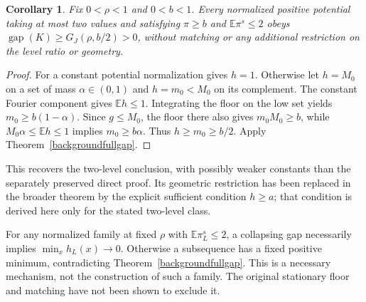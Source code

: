 \documentclass[11pt]{article}
\newcommand{\E}{\mathbb E}
\newtheorem{corollary}[theorem]{Corollary}
\begin{document}
\begin{corollary}\label{twolevelfullgap}
Fix $0<\rho<1$ and $0<b<1$. Every normalized positive potential taking
at most two values and satisfying $\pi\geq b$ and $\E\pi^s\leq2$ obeys
$\operatorname{gap}(K)\geq G_J(\rho,b/2)>0$, without matching or any
additional restriction on the level ratio or geometry.
\end{corollary}
\begin{proof}
For a constant potential normalization gives $h=1$.
Otherwise let $h=M_0$ on a set of mass $\alpha\in(0,1)$ and $h=m_0<M_0$
on its complement. The constant Fourier component gives $\E h\leq1$.
Integrating the floor on the low set yields $m_0\geq b(1-\alpha)$.
Since $g\leq M_0$, the floor there also gives $m_0M_0\geq b$, while
$M_0\alpha\leq\E h\leq1$ implies $m_0\geq b\alpha$.
Thus $h\geq m_0\geq b/2$. Apply Theorem~\ref{backgroundfullgap}.
\end{proof}
This recovers the two-level conclusion, with possibly weaker constants
than the separately preserved direct proof. Its geometric restriction
has been replaced in the broader theorem by the explicit sufficient
condition $h\geq a$; that condition is derived here only for the
stated two-level class.

For any normalized family at fixed $\rho$ with $\E\pi_L^s\leq2$, a
collapsing gap necessarily implies $\min_x h_L(x)\to0$.
Otherwise a subsequence has a fixed positive minimum, contradicting
Theorem~\ref{backgroundfullgap}. This is a necessary mechanism,
not the construction of such a family. The original stationary floor
and matching have not been shown to exclude it.
\end{document}
